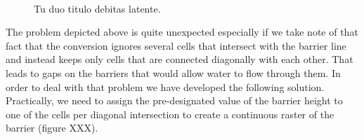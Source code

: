 \begin{figure}[h!]
  \myfloatalign
   \quad
   \\
   \quad
  \caption[Generated extra pixels]{Tu duo titulo debitas
  latente.}\label{fig:example}
\end{figure}

The problem depicted above is quite unexpected especially if we take note of that fact that the conversion ignores several cells that intersect with the barrier line and instead keeps only cells that are connected diagonally with each other. That leads to gaps on the barriers that would allow water to flow through them. In order to deal with that problem we have developed the following solution. \\
Practically, we need to assign the pre-designated value of the barrier height to one of the cells per diagonal intersection to create a continuous raster of the barrier (figure XXX). 

